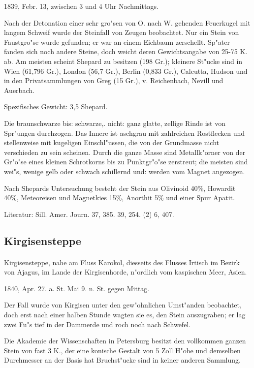 \documentclass[a4paper, 11pt, oneside]{article}
\begin{document}
1839, Febr. 13, zwischen 3 und 4 Uhr Nachmittags.

Nach der Detonation einer sehr gro"sen von O. nach W. gehenden Feuerkugel mit langem Schweif wurde der Steinfall von Zeugen beobachtet. Nur ein Stein von Faustgro"se wurde gefunden; er war an einem Eichbaum zerschellt. Sp"ater fanden sich noch andere Steine, doch weicht deren Gewichtsangabe von 25-75 K. ab. Am meisten scheint Shepard zu besitzen (198 Gr.); kleinere St"ucke sind in Wien (61,796 Gr.), London (56,7 Gr.), Berlin (0,833 Gr.), Calcutta, Hudson und in den Privatsammlungen von Greg (15 Gr.), v. Reichenbach, Nevill und Auerbach.

Spezifisches Gewicht: 3,5 Shepard.

Die braunschwarze bis: schwarze,. nicht: ganz glatte, zellige Rinde ist von Spr"ungen durchzogen. Das Innere ist aschgrau mit zahlreichen Rostflecken und stellenweise mit kugeligen Einschl"ussen, die von der Grundmasse nicht verschieden zu sein scheinen. Durch die ganze Masse sind Metallk"orner von der Gr"o"se eines kleinen Schrotkorns bis zu Punktgr"o"se zerstreut; die meisten sind wei"s, wenige gelb oder schwach schillernd und: werden vom Magnet angezogen.

Nach Shepards Untersuchung besteht der Stein aus Olivinoid 40\%, Howardit 40\%, Meteoreisen und Magnetkies 15\%, Anorthit 5\% und einer Spur Apatit.

\footnotesize
Literatur: Sill. Amer. Journ. 37, 385. 39, 254. (2) 6, 407.

\subsection{Kirgisensteppe}
\normalsize
\paragraph{}
Kirgisensteppe, nahe am Fluss Karokol, diesseits des Flusses Irtisch im Bezirk von Ajagus, im Lande der Kirgisenhorde, n"ordlich vom kaspischen Meer, Asien.

1840, Apr. 27. a. St. Mai 9. n. St. gegen Mittag.

Der Fall wurde von Kirgisen unter den gew"ohnlichen Umst"anden beobachtet, doch erst nach einer halben Stunde wagten sie es, den Stein auszugraben; er lag zwei Fu"s tief in der Dammerde und roch noch nach Schwefel.

Die Akademie der Wissenschaften in Petersburg besitzt den vollkommen ganzen Stein von fast 3 K., der eine konische Gestalt von 5 Zoll H"ohe und demselben Durchmesser an der Basis hat Bruchst"ucke sind in keiner anderen Sammlung.
\end{document}

